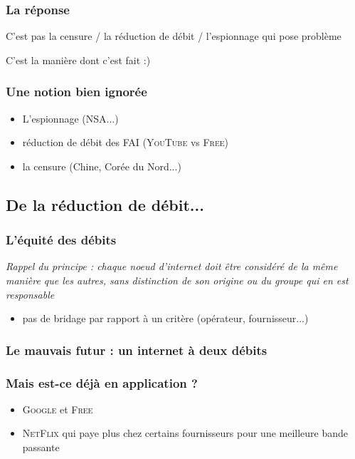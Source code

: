 \begin{frame}\frametitle{La réponse}
    \begin{center}
        {\Large C'est pas la censure / la réduction de débit / l'espionnage qui pose problème}

        \vspace{2em}

        {\Large C'est la manière dont c'est fait :)}
    \end{center}
\end{frame}


\begin{frame}\frametitle{Une notion bien ignorée}
    \begin{itemize}
        \item L'espionnage (\textsc{NSA}...)
        \item réduction de débit des FAI (\textsc{YouTube} vs \textsc{Free})
        \item la censure (Chine, Corée du Nord...)
    \end{itemize}
\end{frame}


\subsection{De la réduction de débit...}
\begin{frame}\frametitle{L'équité des débits}
    \emph{Rappel du principe : chaque noeud d'internet doit être considéré de
        la même manière que les autres, sans distinction de son origine ou du
    groupe qui en est responsable}
    \begin{itemize}
        \item pas de bridage par rapport à un critère (opérateur, fournisseur...)
    \end{itemize}
\end{frame}


\begin{frame}\frametitle{Le mauvais futur : un internet à deux débits}
\end{frame}


\begin{frame}\frametitle{Mais est-ce déjà en application ?}
    \begin{itemize}
        \item \textsc{Google} et \textsc{Free}
        \item \textsc{NetFlix} qui paye plus chez certains fournisseurs pour une meilleure bande passante
    \end{itemize}
\end{frame}


